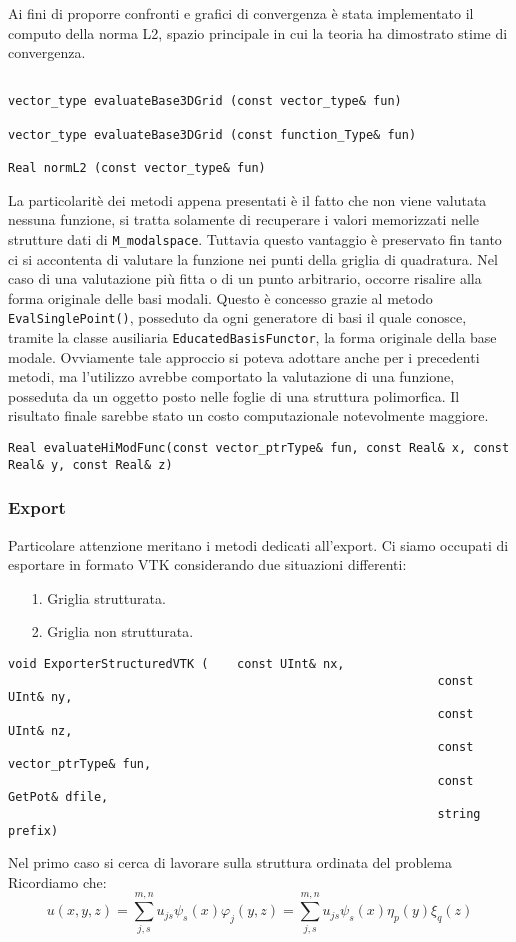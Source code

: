 Ai fini di proporre confronti e grafici di convergenza \`e stata implementato il computo della norma L2, spazio principale in cui la teoria ha dimostrato stime di convergenza.

\begin{lstlisting}[style = general,frame=none]

vector_type evaluateBase3DGrid (const vector_type& fun)

vector_type evaluateBase3DGrid (const function_Type& fun)

Real normL2 (const vector_type& fun)

\end{lstlisting}

La particolarit\`e dei metodi appena presentati \`e il fatto che non viene valutata nessuna funzione, si tratta solamente di recuperare i valori memorizzati nelle strutture dati di \texttt{M\_modalspace}. Tuttavia questo vantaggio \`e preservato fin tanto ci si accontenta di valutare la funzione nei punti della griglia di quadratura. Nel caso di una valutazione pi\`u fitta o di un punto arbitrario, occorre risalire alla forma originale delle basi modali. Questo \`e concesso grazie al metodo \texttt{EvalSinglePoint()}, posseduto da ogni generatore di basi il quale conosce, tramite la classe ausiliaria  \texttt{EducatedBasisFunctor}, la forma originale della base modale. Ovviamente tale approccio si poteva adottare anche per i precedenti metodi, ma l'utilizzo avrebbe comportato la valutazione di una funzione, posseduta da un oggetto posto nelle foglie di una struttura polimorfica. Il risultato finale sarebbe stato un costo computazionale notevolmente maggiore.
\begin{lstlisting}[style = general, frame = none]
Real evaluateHiModFunc(const vector_ptrType& fun, const Real& x, const Real& y, const Real& z)
\end{lstlisting}


\subsubsection{Export}

Particolare attenzione meritano i metodi dedicati all'export. Ci siamo occupati di esportare in formato VTK considerando due situazioni differenti:
\begin{itemize}
\item[1.] Griglia strutturata.
\item[2.] Griglia non strutturata.
\end{itemize}
\begin{lstlisting}[style = general]
void ExporterStructuredVTK (	const UInt& nx,
															const UInt& ny,
															const UInt& nz,
															const vector_ptrType& fun,
															const GetPot& dfile, 
															string prefix)
\end{lstlisting}
Nel primo caso si cerca di lavorare sulla struttura ordinata del problema
Ricordiamo che:
\begin{equation}
u(x,y,z) = \sum_{j,s}^{m,n}u_{js}\psi_s(x)\varphi_j(y,z) = \sum_{j,s}^{m,n}u_{js}\psi_s(x)\eta_p(y)\xi_q(z)
\end{equation}

